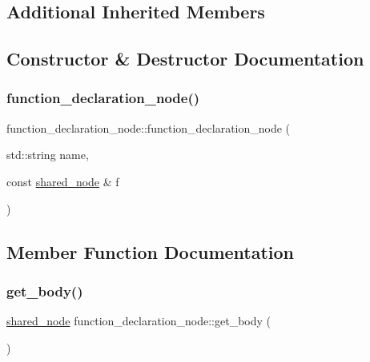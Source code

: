 \subsection*{Additional Inherited Members}


\subsection{Constructor \& Destructor Documentation}
\mbox{\label{classjawe_1_1function__declaration__node_ac28b6a6e48b90529b7fda41db75228d5}} 
\subsubsection{\texorpdfstring{function\+\_\+declaration\+\_\+node()}{function\_declaration\_node()}}
{\footnotesize\ttfamily function\+\_\+declaration\+\_\+node\+::function\+\_\+declaration\+\_\+node (\begin{DoxyParamCaption}\item[{std\+::string}]{name,  }\item[{const \hyperlink{namespacejawe_a3f307481d921b6cbb50cc8511fc2b544}{shared\+\_\+node} \&}]{f }\end{DoxyParamCaption})}



\subsection{Member Function Documentation}
\mbox{\label{classjawe_1_1function__declaration__node_a012175493728b93d76b640d81d457887}} 
\subsubsection{\texorpdfstring{get\+\_\+body()}{get\_body()}}
{\footnotesize\ttfamily \hyperlink{namespacejawe_a3f307481d921b6cbb50cc8511fc2b544}{shared\+\_\+node} function\+\_\+declaration\+\_\+node\+::get\+\_\+body (\begin{DoxyParamCaption}{ }\end{DoxyParamCaption})}

